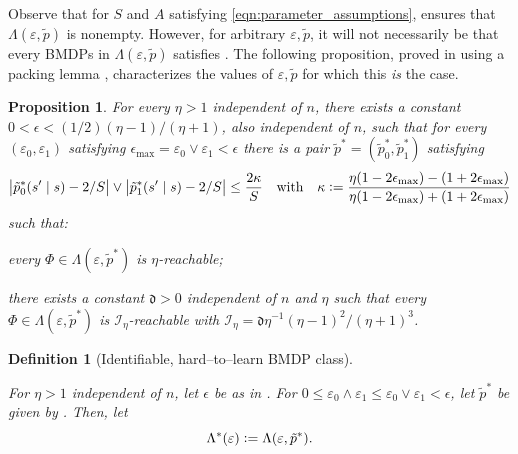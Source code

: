 \documentclass[11pt]{article}
\newcommand{\eqdef}{\vcentcolon=}
\newcommand{\mf}[1]{\mathfrak{#1}}
\newcommand{\mcI}{\mathcal{I}}
\newtheorem{proposition}[theorem]{Proposition}
\newtheorem{definition}[theorem]{Definition}
\theoremstyle{definition}
\theoremstyle{definition}
\begin{document}
Observe that for $S$ and $A$ satisfying \eqref{eqn:parameter_assumptions},  ensures that $\Lambda( \varepsilon, \tilde{p} )$ is nonempty.
However, for arbitrary $\varepsilon, \tilde{p}$, it will not necessarily be that every \glspl{BMDP} in $\Lambda( \varepsilon, \tilde{p} )$ satisfies .
The following proposition, proved in  using a packing lemma \cite{jin2020reward}, characterizes the values of $\varepsilon, \tilde{p}$ for which this \emph{is} the case.

\begin{proposition}
	\label{prop:kernel_allows_identifiability}
	For every $\eta>1$ independent of $n$,
	there exists a constant $0 < \epsilon < (1/2)(\eta-1)/(\eta+1)$,
	also independent of $n$,
	such that
	for every $(\varepsilon_0, \varepsilon_1)$ satisfying $\epsilon_{\max} = \varepsilon_0 \vee \varepsilon_1 < \epsilon$
	there is a pair $\tilde{p}^*=(\tilde{p}^*_0,\tilde{p}^*_1)$ satisfying
	\begin{equation}
		\label{eqn:tilde_p_distance_from_uniform}
		\bigl| \tilde{p}^*_0(s' \mid s) - 2/S \bigr|
		\vee
		\bigl| \tilde{p}^*_1(s' \mid s) - 2/S \bigr|
		\leq
		\frac{2\kappa}{S}
		\quad
		\mathrm{with}
		\quad
		\kappa
		\eqdef
		\frac{ \eta(1-2\epsilon_{\max})-(1+2\epsilon_{\max}) }{\eta(1-2\epsilon_{\max})+(1+2\epsilon_{\max})}
	\end{equation}
	such that:
	\begin{propenum}
		\item \label{prop:kernel_allows_identifiability--reachability}
		      every $\Phi \in \Lambda( \varepsilon, \tilde{p}^* )$ is $\eta$-reachable;

		\item \label{prop:kernel_allows_identifiability--identifiability}
		  	  there exists a constant $\mf{d}>0$ independent of $n$ and $\eta$ such that every $\Phi \in \Lambda( \varepsilon, \tilde{p}^* )$ is $\mcI_{\eta}$-reachable with $\mathcal{I}_{\eta} = \mf{d}\eta^{-1}(\eta-1)^2/(\eta+1)^3$.
	\end{propenum}
\end{proposition}

\begin{definition}[Identifiable, hard--to--learn \gls{BMDP} class]
	\label{def:identifiable_hard_to_learn_class}

	For $\eta > 1$ independent of $n$, let $\epsilon$ be as in .
	For $0 \leq \varepsilon_0 \wedge \varepsilon_1 \leq \varepsilon_0 \vee \varepsilon_1 < \epsilon$, let $\tilde{p}^*$ be given by .
	Then, let
	\begin{equation}
		\label{eqn:hard_to_learn_class_def}
		\Lambda^*( \varepsilon )
		\eqdef
		\Lambda( \varepsilon, \tilde{p}^* )
		.
	\end{equation}
\end{definition}
\end{document}
